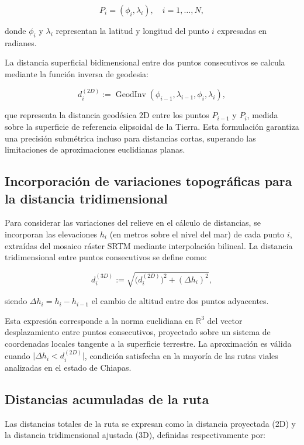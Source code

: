 \documentclass[
  spanish,
  us-letterpaper,
]{scrreprt}
\numberwithin{equation}{section}
\begin{document}
\[
P_i = (\phi_i, \lambda_i), \quad i = 1, \dots, N,
\]

donde \(\phi_i\) y \(\lambda_i\) representan la latitud y longitud del
punto \(i\) expresadas en radianes.

La distancia superficial bidimensional entre dos puntos consecutivos se
calcula mediante la función inversa de geodesia:

\[
d_i^{(2D)} := \operatorname{GeodInv}(\phi_{i-1}, \lambda_{i-1}, \phi_i, \lambda_i),
\]

que representa la distancia geodésica 2D entre los puntos \(P_{i-1}\) y
\(P_i\), medida sobre la superficie de referencia elipsoidal de la
Tierra. Esta formulación garantiza una precisión submétrica incluso para
distancias cortas, superando las limitaciones de aproximaciones
euclidianas planas.

\subsection{Incorporación de variaciones topográficas para la distancia
tridimensional}\label{incorporaciuxf3n-de-variaciones-topogruxe1ficas-para-la-distancia-tridimensional}

Para considerar las variaciones del relieve en el cálculo de distancias,
se incorporan las elevaciones \(h_i\) (en metros sobre el nivel del mar)
de cada punto \(i\), extraídas del mosaico ráster SRTM mediante
interpolación bilineal. La distancia tridimensional entre puntos
consecutivos se define como:

\[
d_i^{(3D)} := \sqrt{\bigl(d_i^{(2D)}\bigr)^2 + (\Delta h_i)^2},
\]

siendo \(\Delta h_i = h_i - h_{i-1}\) el cambio de altitud entre dos
puntos adyacentes.

Esta expresión corresponde a la norma euclidiana en \(\mathbb{R}^3\) del
vector desplazamiento entre puntos consecutivos, proyectado sobre un
sistema de coordenadas locales tangente a la superficie terrestre. La
aproximación es válida cuando \(\lvert \Delta h_i < d_i^{(2D)}\rvert\),
condición satisfecha en la mayoría de las rutas viales analizadas en el
estado de Chiapas.

\subsection{Distancias acumuladas de la
ruta}\label{distancias-acumuladas-de-la-ruta}

Las distancias totales de la ruta se expresan como la distancia
proyectada (2D) y la distancia tridimensional ajustada (3D), definidas
respectivamente por:
\end{document}
